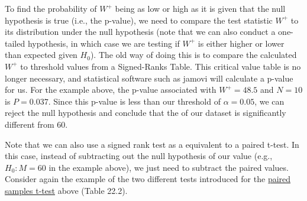\documentclass[
  openany]{krantz}
\begin{document}
To find the probability of \(W^{+}\) being as low or high as it is given that the null hypothesis is true (i.e., the p-value), we need to compare the test statistic \(W^{+}\) to its distribution under the null hypothesis (note that we can also conduct a one-tailed hypothesis, in which case we are testing if \(W^{+}\) is either higher or lower than expected given \(H_{0}\)).
The old way of doing this is to compare the calculated \(W^{+}\) to threshold values from a  Signed-Ranks Table.
This critical value table is no longer necessary, and statistical software such as jamovi will calculate a p-value for us.
For the example above, the p-value associated with \(W^{+} = 48.5\) and \(N = 10\) is \(P = 0.037\).
Since this p-value is less than our threshold of \(\alpha = 0.05\), we can reject the null hypothesis and conclude that the  of our dataset is significantly different from 60.

Note that we can also use a  signed rank test as a  equivalent to a paired t-test.
In this case, instead of subtracting out the null hypothesis of our  value (e.g., \(H_{0}: M = 60\) in the example above), we just need to subtract the paired values.
Consider again the example of the two different tests introduced for the \protect\hyperlink{paired-sample-t-test}{paired samples t-test} above (Table 22.2).
\end{document}
